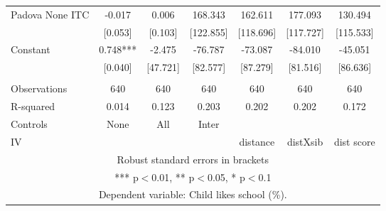 \begin{tabular}{lcccccc}
Padova None ITC & -0.017 & 0.006 & 168.343 & 162.611 & 177.093 & 130.494 \\
 & [0.053] & [0.103] & [122.855] & [118.696] & [117.727] & [115.533] \\
Constant & 0.748*** & -2.475 & -76.787 & -73.087 & -84.010 & -45.051 \\
 & [0.040] & [47.721] & [82.577] & [87.279] & [81.516] & [86.636] \\
 &  &  &  &  &  &  \\
Observations & 640 & 640 & 640 & 640 & 640 & 640 \\
R-squared & 0.014 & 0.123 & 0.203 & 0.202 & 0.202 & 0.172 \\
Controls & None & All & Inter &  &  &  \\
 IV &  &  &  & distance & distXsib & dist score \\ \hline
\multicolumn{7}{c}{ Robust standard errors in brackets} \\
\multicolumn{7}{c}{ *** p$<$0.01, ** p$<$0.05, * p$<$0.1} \\
\multicolumn{7}{c}{ Dependent variable: Child likes school (\%).} \\
\end{tabular}
